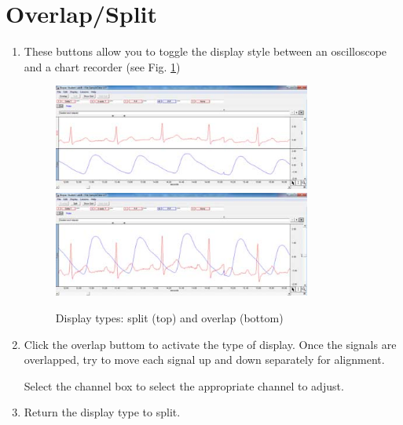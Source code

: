 \documentclass{article}
\begin{document}
\section*{Overlap/Split}
\begin{enumerate}
	\item These buttons allow you to toggle the display style between an oscilloscope and a chart recorder (see Fig. \ref{overlap_split})
	
		\begin{figure}[h]
		\includegraphics[width=0.8\textwidth]{../images/BIOPAC_11a.jpg}
		\includegraphics[width=0.8\textwidth]{../images/BIOPAC_11b.jpg}
		\centering
		\caption{Display types: split (top) and overlap (bottom)}
		\label{overlap_split}
		\end{figure}
	
	\item Click the overlap buttom to activate the type of display. Once the signals are overlapped, try to move each signal up and down separately for alignment.
		\begin{info}
			Select the channel box to select the appropriate channel to adjust.
		\end{info}
		
	\item Return the display type to split.
\end{enumerate}
\end{document}

